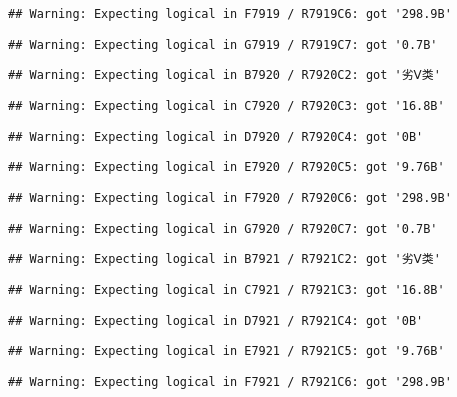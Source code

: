 \documentclass[
]{article}
\begin{document}
\begin{verbatim}
## Warning: Expecting logical in F7919 / R7919C6: got '298.9B'
\end{verbatim}

\begin{verbatim}
## Warning: Expecting logical in G7919 / R7919C7: got '0.7B'
\end{verbatim}

\begin{verbatim}
## Warning: Expecting logical in B7920 / R7920C2: got '劣Ⅴ类'
\end{verbatim}

\begin{verbatim}
## Warning: Expecting logical in C7920 / R7920C3: got '16.8B'
\end{verbatim}

\begin{verbatim}
## Warning: Expecting logical in D7920 / R7920C4: got '0B'
\end{verbatim}

\begin{verbatim}
## Warning: Expecting logical in E7920 / R7920C5: got '9.76B'
\end{verbatim}

\begin{verbatim}
## Warning: Expecting logical in F7920 / R7920C6: got '298.9B'
\end{verbatim}

\begin{verbatim}
## Warning: Expecting logical in G7920 / R7920C7: got '0.7B'
\end{verbatim}

\begin{verbatim}
## Warning: Expecting logical in B7921 / R7921C2: got '劣Ⅴ类'
\end{verbatim}

\begin{verbatim}
## Warning: Expecting logical in C7921 / R7921C3: got '16.8B'
\end{verbatim}

\begin{verbatim}
## Warning: Expecting logical in D7921 / R7921C4: got '0B'
\end{verbatim}

\begin{verbatim}
## Warning: Expecting logical in E7921 / R7921C5: got '9.76B'
\end{verbatim}

\begin{verbatim}
## Warning: Expecting logical in F7921 / R7921C6: got '298.9B'
\end{verbatim}
\end{document}
